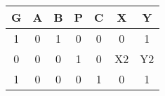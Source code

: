 \begin{tabular}{|c| |c| |c| |c| |c| |c| |c|}
    \hline
      \textbf {G} & \textbf{A} & \textbf{B} & \textbf{P} & \textbf{C} & \textbf{X} & \textbf{Y} \\
      \hline
       1 & 0 & 1 & 0 & 0 & 0 & 1\\
       \hline
       0 & 0 & 0 & 1 & 0 & X2 & Y2 \\
       \hline
       1 & 0 & 0 & 0 & 1 & 0 & 1 \\
       \hline
       \end{tabular}
    